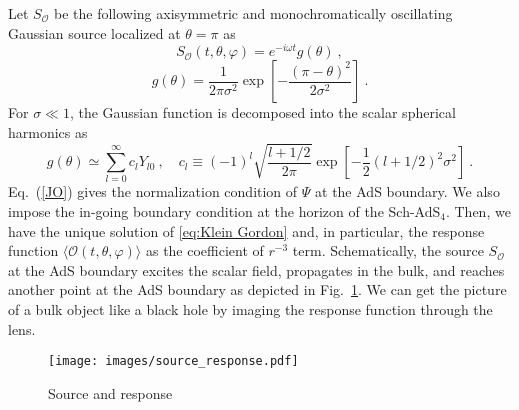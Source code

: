\documentclass[a4paper,11pt]{article}
\begin{document}
    Let $S_{\mathcal{O}}$ be the following axisymmetric and monochromatically oscillating Gaussian source localized at $\theta=\pi$ as
    \begin{equation}
        S_{\mathcal{O}}(t,\theta,\varphi) = e^{-i \omega t} g(\theta)\ ,
        \label{JO}
    \end{equation}
    \begin{equation}
    \label{eq:Gaussian_source}
    g(\theta) = \frac{1}{2\pi \sigma^2} \exp{ \left[-\frac{(\pi-\theta)^2}{2\sigma^2} \right]}\ .
    \end{equation}
    For $\sigma\ll 1$, the Gaussian function is decomposed into the scalar spherical harmonics as 
    \begin{equation}
    g(\theta) \simeq  \sum_{l=0}^\infty c_l Y_{l0}\ ,\quad  c_l\equiv 
    (-1)^l \sqrt{\frac{l+1/2}{2\pi}}\exp\left[-\frac{1}{2}(l+1/2)^2 \sigma^2\right]\ .
    \label{eq:vector_mode_cl}
    \end{equation}
    Eq.~(\ref{JO}) gives the normalization condition of $\Psi$ at the AdS boundary. We also impose the in-going boundary condition at the horizon of the Sch-AdS$_{4}$. Then, we have the unique solution of \eqref{eq:Klein Gordon} and, in particular, the response function $\langle \mathcal{O}(t,\theta,\varphi) \rangle$ as the coefficient of $r^{-3}$ term. Schematically, the source $S_{\mathcal{O}}$ at the AdS boundary excites the scalar field, propagates in the bulk, and reaches another point at the AdS boundary as depicted in Fig.~\ref{fig:source_response}. We can get the picture of a bulk object like a black hole by imaging the response function through the lens.
    \begin{figure}[ht]
        \centering
		\texttt{[image: images/source\_response.pdf]}
        \caption{Source and response}
        \label{fig:source_response}
    \end{figure}
\end{document}
